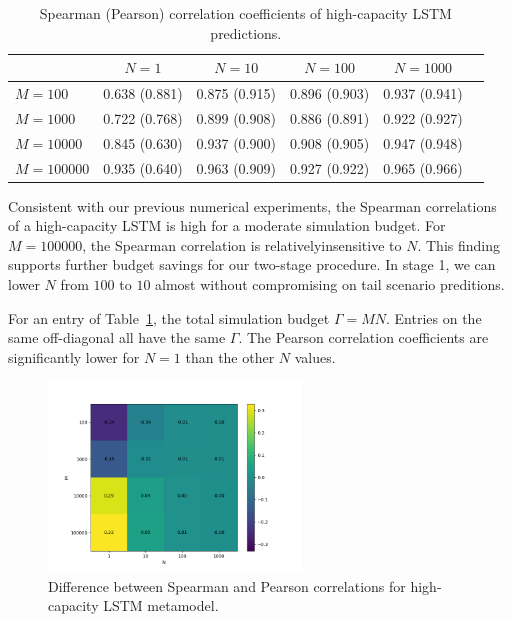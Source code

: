 \begin{table}[ht!]
    \small
    \centering
    \begin{tabular}{lccccc}
        \toprule
                           & $N=\num{1}$   & $N=\num{10}$  & $N=\num{100}$ & $N=\num{1000}$ \\
        \midrule
        $M = \num{100}$    & 0.638 (0.881) & 0.875 (0.915) & 0.896 (0.903) & 0.937 (0.941) \\
        $M = \num{1000}$   & 0.722 (0.768) & 0.899 (0.908) & 0.886 (0.891) & 0.922 (0.927) \\
        $M = \num{10000}$  & 0.845 (0.630) & 0.937 (0.900) & 0.908 (0.905) & 0.947 (0.948) \\
        $M = \num{100000}$ & 0.935 (0.640) & 0.963 (0.909) & 0.927 (0.922) & 0.965 (0.966) \\
        \bottomrule
    \end{tabular}
    \caption{Spearman (Pearson) correlation coefficients of high-capacity LSTM predictions.}
    \label{tab2:lstm_corr}
\end{table}

Consistent with our previous numerical experiments, the Spearman correlations of a high-capacity LSTM is high for a moderate simulation budget. 
For $M= \num{100000}$, the Spearman correlation is relativelyinsensitive to $N$.
This finding supports further budget savings for our two-stage procedure.
In stage 1, we can lower $N$ from $\num{100}$ to $\num{10}$ almost without compromising on tail scenario preditions. 

For an entry of Table~\ref{tab2:lstm_corr}, the total simulation budget $\Gamma = M N$. 
Entries on the same off-diagonal all have the same $\Gamma$.
The Pearson correlation coefficients are significantly lower for $N=\num{1}$ than the other $N$ values.

\begin{figure}
    \centering
    \includegraphics[width=0.6\textwidth]{./project2/figures/cor_heatmap.png}
    \caption{Difference between Spearman and Pearson correlations for high-capacity LSTM metamodel.}
    \label{fig2:cor-heatmap}
\end{figure}

